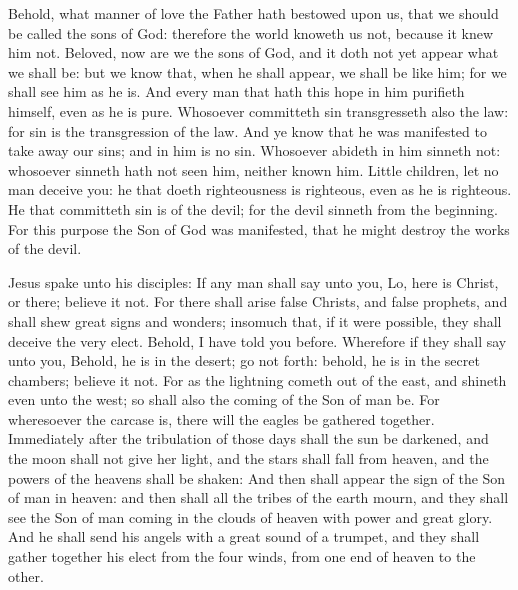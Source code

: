  Behold, what manner of love the Father hath bestowed upon us, that we should be called the sons of God: therefore the world knoweth us not, because it knew him not. Beloved, now are we the sons of God, and it doth not yet appear what we shall be: but we know that, when he shall appear, we shall be like him; for we shall see him as he is. And every man that hath this hope in him purifieth himself, even as he is pure. Whosoever committeth sin transgresseth also the law: for sin is the transgression of the law. And ye know that he was manifested to take away our sins; and in him is no sin. Whosoever abideth in him sinneth not: whosoever sinneth hath not seen him, neither known him. Little children, let no man deceive you: he that doeth righteousness is righteous, even as he is righteous. He that committeth sin is of the devil; for the devil sinneth from the beginning. For this purpose the Son of God was manifested, that he might destroy the works of the devil.


 Jesus spake unto his disciples: If any man shall say unto you, Lo, here is Christ, or there; believe it not. For there shall arise false Christs, and false prophets, and shall shew great signs and wonders; insomuch that, if it were possible, they shall deceive the very elect. Behold, I have told you before. Wherefore if they shall say unto you, Behold, he is in the desert; go not forth: behold, he is in the secret chambers; believe it not. For as the lightning cometh out of the east, and shineth even unto the west; so shall also the coming of the Son of man be. For wheresoever the carcase is, there will the eagles be gathered together. Immediately after the tribulation of those days shall the sun be darkened, and the moon shall not give her light, and the stars shall fall from heaven, and the powers of the heavens shall be shaken: And then shall appear the sign of the Son of man in heaven: and then shall all the tribes of the earth mourn, and they shall see the Son of man coming in the clouds of heaven with power and great glory. And he shall send his angels with a great sound of a trumpet, and they shall gather together his elect from the four winds, from one end of heaven to the other.

